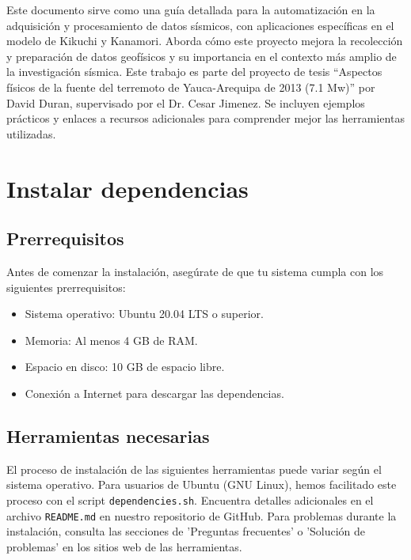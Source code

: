 \documentclass[a4paper,11pt]{refart}
\begin{document}
Este documento sirve como una guía detallada para la automatización en la adquisición y procesamiento de datos sísmicos, con aplicaciones específicas en el modelo de Kikuchi y Kanamori. 
Aborda cómo este proyecto mejora la recolección y preparación de datos geofísicos y su importancia en el contexto más amplio de la investigación sísmica. 
Este trabajo es parte del proyecto de tesis ``Aspectos físicos de la fuente del terremoto de Yauca-Arequipa de 2013 (7.1 Mw)'' por David Duran, supervisado por el Dr. Cesar Jimenez. 
Se incluyen ejemplos prácticos y enlaces a recursos adicionales para comprender mejor las herramientas utilizadas.

\section{Instalar dependencias}

\subsection{Prerrequisitos}

Antes de comenzar la instalación, asegúrate de que tu sistema cumpla con los siguientes prerrequisitos:

\begin{itemize}
  \item Sistema operativo: Ubuntu 20.04 LTS o superior.
  \item Memoria: Al menos 4 GB de RAM.
  \item Espacio en disco: 10 GB de espacio libre.
  \item Conexión a Internet para descargar las dependencias.
\end{itemize}

\subsection{Herramientas necesarias}

\begin{leftbar}
  El proceso de instalación de las siguientes herramientas puede variar según el sistema operativo. Para usuarios de Ubuntu (GNU Linux), hemos facilitado este proceso con el script \texttt{dependencies.sh}. Encuentra detalles adicionales en el archivo \texttt{README.md} en nuestro repositorio de GitHub. Para problemas durante la instalación, consulta las secciones de 'Preguntas frecuentes' o 'Solución de problemas' en los sitios web de las herramientas.
\end{leftbar}
\end{document}
